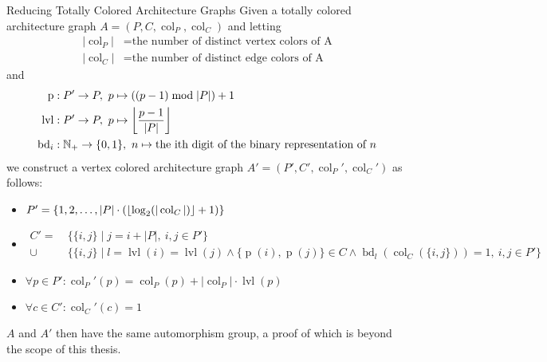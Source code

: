 \begin{thm}{Reducing Totally Colored Architecture Graphs}
  Given a totally colored architecture graph $A = (P, C, \operatorname{col}_P,
  \operatorname{col}_C)$ and letting
  \begin{align*}
    |\operatorname{col}_P| &= \text{the number of distinct vertex colors of A} \\
    |\operatorname{col}_C| &= \text{the number of distinct edge colors of A}
  \end{align*}
  and
  \begin{align*}
    \operatorname{p}&: P' \rightarrow P,\ p \mapsto ((p - 1) \bmod |P|) + 1 \\
    \operatorname{lvl}&: P' \rightarrow P,\ p \mapsto \floor*{\frac{p - 1}{|P|}} \\
    \operatorname{bd}_i&: \mathbb{N}_+ \rightarrow \{0,1\},\
    n \mapsto \text{the ith digit of the binary representation of } n
  \end{align*}
  we construct a vertex colored architecture graph $A' = (P', C',
  \operatorname{col}_P', \operatorname{col}_C')$ as follows:
  \begin{itemize}
    \item $P' = \{1, 2, \dots, |P| \cdot (\floor*{\log_2(|\operatorname{col}_C|)} + 1)\}$
    \item
      $\begin{aligned}
        C' =\ &\{\{i, j\} \mid j = i + |P|,\ i, j \in P'\} \\
        \cup\ &\{\{i, j\} \mid
          l = \operatorname{lvl}(i) = \operatorname{lvl}(j)
            \land
          \{\operatorname{p}(i), \operatorname{p}(j)\} \in C
            \land
          \operatorname{bd}_l(\operatorname{col}_C(\{i,j\})) = 1,\ i, j \in P'\}
      \end{aligned}$
    \item $\forall p \in P': \operatorname{col}_P'(p) =
      \operatorname{col}_P(p) + |\operatorname{col}_P| \cdot \operatorname{lvl}(p)$
    \item $\forall c \in C': \operatorname{col}_C'(c) = 1$
  \end{itemize}
  $A$ and $A'$ then have the same automorphism group, a proof of which is beyond
  the scope of this thesis.
\end{thm}


